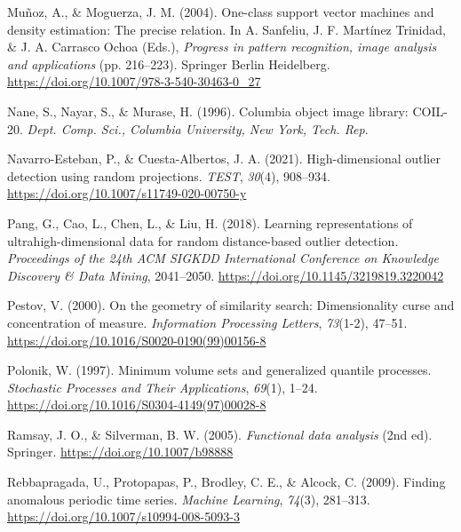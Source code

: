 \documentclass[
  10pt]{article}
\newlength{\cslhangindent}
\newlength{\cslentryspacingunit} %
\newenvironment{CSLReferences}[2] %
 {%
  \setlength{\parindent}{0pt}
  \ifodd #1
  \let\oldpar\par
  \def\par{\hangindent=\cslhangindent\oldpar}
  \fi
  \setlength{\parskip}{#2\cslentryspacingunit}
 }%
 {}
\begin{document}
\begin{CSLReferences}{1}{0}
\leavevmode{}%
Muñoz, A., \& Moguerza, J. M. (2004). One-class support vector machines and density estimation: The precise relation. In A. Sanfeliu, J. F. Martínez Trinidad, \& J. A. Carrasco Ochoa (Eds.), \emph{Progress in pattern recognition, image analysis and applications} (pp. 216--223). Springer Berlin Heidelberg. \url{https://doi.org/10.1007/978-3-540-30463-0_27}

\leavevmode{}%
Nane, S., Nayar, S., \& Murase, H. (1996). Columbia object image library: COIL-20. \emph{Dept. Comp. Sci., Columbia University, New York, Tech. Rep}.

\leavevmode{}%
Navarro-Esteban, P., \& Cuesta-Albertos, J. A. (2021). High-dimensional outlier detection using random projections. \emph{TEST}, \emph{30}(4), 908--934. \url{https://doi.org/10.1007/s11749-020-00750-y}

\leavevmode{}%
Pang, G., Cao, L., Chen, L., \& Liu, H. (2018). Learning representations of ultrahigh-dimensional data for random distance-based outlier detection. \emph{Proceedings of the 24th ACM SIGKDD International Conference on Knowledge Discovery \& Data Mining}, 2041--2050. \url{https://doi.org/10.1145/3219819.3220042}

\leavevmode{}%
Pestov, V. (2000). On the geometry of similarity search: Dimensionality curse and concentration of measure. \emph{Information Processing Letters}, \emph{73}(1-2), 47--51. \url{https://doi.org/10.1016/S0020-0190(99)00156-8}

\leavevmode{}%
Polonik, W. (1997). Minimum volume sets and generalized quantile processes. \emph{Stochastic Processes and Their Applications}, \emph{69}(1), 1--24. \url{https://doi.org/10.1016/S0304-4149(97)00028-8}

\leavevmode{}%
Ramsay, J. O., \& Silverman, B. W. (2005). \emph{Functional data analysis} (2nd ed). Springer. \url{https://doi.org/10.1007/b98888}

\leavevmode{}%
Rebbapragada, U., Protopapas, P., Brodley, C. E., \& Alcock, C. (2009). Finding anomalous periodic time series. \emph{Machine Learning}, \emph{74}(3), 281--313. \url{https://doi.org/10.1007/s10994-008-5093-3}


\end{CSLReferences}
\end{document}
